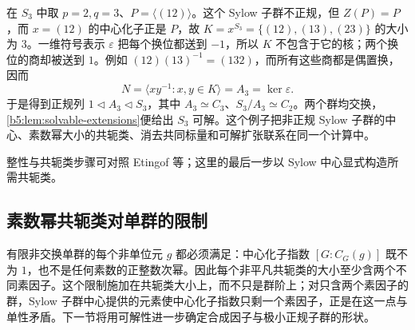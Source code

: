在 \(S_3\) 中取 \(p=2,q=3\)、\(P=\langle(12)\rangle\)。这个 Sylow 子群不正规，但 \(Z(P)=P\)，而 \(x=(12)\) 的中心化子正是 \(P\)，故 \(K=x^{S_3}=\{(12),(13),(23)\}\) 的大小为 \(3\)。一维符号表示 \(\varepsilon\) 把每个换位都送到 \(-1\)，所以 \(K\) 不包含于它的核；两个换位的商却被送到 \(1\)。例如 \((12)(13)^{-1}=(132)\)，而所有这些商都是偶置换，因而
\[
	N=\langle xy^{-1}:x,y\in K\rangle=A_3=\ker\varepsilon.
\]
于是得到正规列 \(1\triangleleft A_3\triangleleft S_3\)，其中 \(A_3\simeq C_3\)、\(S_3/A_3\simeq C_2\)。两个群均交换，\cref{b5:lem:solvable-extensions}便给出 \(S_3\) 可解。这个例子把非正规 Sylow 子群的中心、素数幂大小的共轭类、消去共同标量和可解扩张联系在同一个计算中。

\ProseParagraphBreak
整性与共轭类步骤可对照 Etingof 等\cite[Theorems 5.4.3, 5.4.4, 5.4.6; Lemmas 5.4.5, 5.4.7, pp. 98--100]{EtingofEtAl2011RepresentationTheory}；这里的最后一步以 Sylow 中心显式构造所需共轭类。

\subsection{素数幂共轭类对单群的限制}
\label{b5:subsec:0505:05}

有限非交换单群的每个非单位元 \(g\) 都必须满足：中心化子指数 \([G:C_G(g)]\) 既不为 \(1\)，也不是任何素数的正整数次幂。因此每个非平凡共轭类的大小至少含两个不同素因子。这个限制施加在共轭类大小上，而不只是群阶上；对只含两个素因子的群，Sylow 子群中心提供的元素使中心化子指数只剩一个素因子，正是在这一点与单性矛盾。下一节将用可解性进一步确定合成因子与极小正规子群的形状。
